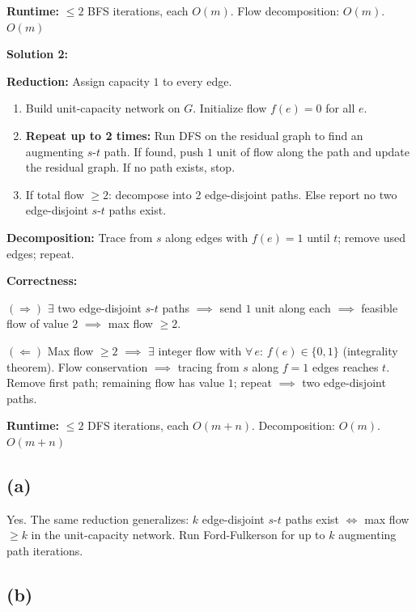 \documentclass[11pt]{article}
\begin{document}
\textbf{Runtime:} $\le 2$ BFS iterations, each $O(m)$. Flow decomposition: $O(m)$. $\boxed{O(m)}$

\medskip

\textbf{Solution 2:}

\textbf{Reduction:} Assign capacity $1$ to every edge.

\begin{enumerate}[leftmargin=*,itemsep=2pt]
\item Build unit-capacity network on $G$. Initialize flow $f(e) = 0$ for all $e$.
\item \textbf{Repeat up to 2 times:} Run DFS on the residual graph to find an augmenting $s$-$t$ path. If found, push $1$ unit of flow along the path and update the residual graph. If no path exists, stop.
\item If total flow $\ge 2$: decompose into 2 edge-disjoint paths. Else report no two edge-disjoint $s$-$t$ paths exist.
\end{enumerate}

\textbf{Decomposition:} Trace from $s$ along edges with $f(e) = 1$ until $t$; remove used edges; repeat.

\textbf{Correctness:}

$(\Rightarrow)$ $\exists$ two edge-disjoint $s$-$t$ paths $\implies$ send $1$ unit along each $\implies$ feasible flow of value $2$ $\implies$ max flow $\ge 2$.

$(\Leftarrow)$ Max flow $\ge 2$ $\implies$ $\exists$ integer flow with $\forall\, e$: $f(e) \in \{0,1\}$ (integrality theorem). Flow conservation $\implies$ tracing from $s$ along $f{=}1$ edges reaches $t$. Remove first path; remaining flow has value $1$; repeat $\implies$ two edge-disjoint paths.

\textbf{Runtime:} $\le 2$ DFS iterations, each $O(m + n)$. Decomposition: $O(m)$. $\boxed{O(m + n)}$

\vspace{-10pt}
\subsection*{(a)}

Yes. The same reduction generalizes: $k$ edge-disjoint $s$-$t$ paths exist $\iff$ max flow $\ge k$ in the unit-capacity network. Run Ford-Fulkerson for up to $k$ augmenting path iterations.

\vspace{-20pt}
\subsection*{(b)}
\end{document}
